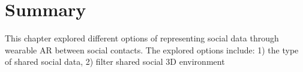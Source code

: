 \section{Summary}

This chapter explored different options of representing social data through wearable AR between social contacts. The explored options include: 1) the type of shared social data, 2) filter shared social 3D environment 

